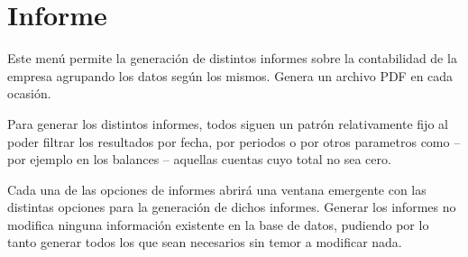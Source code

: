 \section{Informe}

Este menú permite la generación de distintos informes sobre la contabilidad de la empresa agrupando los datos según los mismos. Genera un archivo PDF en cada ocasión.

Para generar los distintos informes, todos siguen un patrón relativamente fijo al poder filtrar los resultados por fecha, por periodos o por otros parametros como -- por ejemplo en los balances -- aquellas cuentas cuyo total no sea cero.

Cada una de las opciones de informes abrirá una ventana emergente con las distintas opciones para la generación de dichos informes. Generar los informes no modifica ninguna información existente en la base de datos, pudiendo por lo tanto generar todos los que sean necesarios sin temor a modificar nada.


